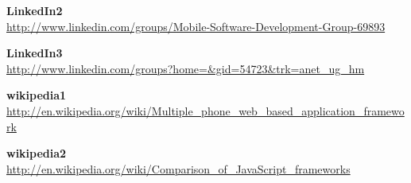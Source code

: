 \documentclass[a4paper,12pt]{book}
\begin{document}
\begin{thebibliography}{25}
\textbf{LinkedIn2}\\
{\footnotesize\url{http://www.linkedin.com/groups/Mobile-Software-Development-Group-69893}}

\textbf{LinkedIn3}\\
{\footnotesize\url{http://www.linkedin.com/groups?home=&gid=54723&trk=anet_ug_hm}}

\textbf{wikipedia1}\\
{\footnotesize\url{http://en.wikipedia.org/wiki/Multiple_phone_web_based_application_framework}}

\textbf{wikipedia2}\\
{\footnotesize\url{http://en.wikipedia.org/wiki/Comparison_of_JavaScript_frameworks}}



\end{thebibliography}
\end{document}
